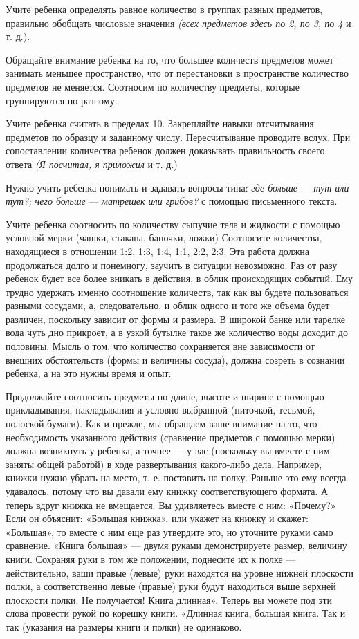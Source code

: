 \documentclass[a5paper]{book}
\renewcommand{\emph}[1]{\textit{#1}}
\begin{document}
Учите ребенка определять равное количество в группах разных предметов,
правильно обобщать числовые значения \emph{(всех предметов здесь по 2,
по 3, по 4} и т. д.).

Обращайте внимание ребенка на то, что большее количеств предметов может
занимать меньшее пространство, что от перестановки в пространстве
количество предметов не меняется. Соотносим по количеству предметы,
которые группируются по-разному.

Учите ребенка считать в пределах 10. Закрепляйте навыки отсчитывания
предметов по образцу и заданному числу. Пересчитывание проводите вслух.
При сопоставлении количества ребенок должен доказывать правильность
своего ответа \emph{(Я посчитал, я приложил} и т. д.)

Нужно учить ребенка понимать и задавать вопросы типа: \emph{где больше}
--- \emph{тут или тут?; чего больше} --- \emph{матрешек или грибов?} с
помощью письменного текста.

Учите ребенка соотносить по количеству сыпучие тела и жидкости с помощью
условной мерки (чашки, стакана, баночки, ложки) Соотносите количества,
находящиеся в отношении 1:2, 1:3, 1:4, 1:1, 2:2, 2:3. Эта работа должна
продолжаться долго и понемногу, заучить в ситуации невозможно. Раз от
разу ребенок будет все более вникать в действия, в облик происходящих
событий. Ему трудно удержать именно соотношение количеств, так как вы
будете пользоваться разными сосудами, а, следовательно, и облик одного и
того же объема будет различен, поскольку зависит от формы и размера. В
широкой банке или тарелке вода чуть дно прикроет, а в узкой бутылке
такое же количество воды доходит до половины. Мысль о том, что
количество сохраняется вне зависимости от внешних обстоятельств (формы и
величины сосуда), должна созреть в сознании ребенка, а на это нужны
время и опыт.

Продолжайте соотносить предметы по длине, высоте и ширине с помощью
прикладывания, накладывания и условно выбранной (ниточкой, тесьмой,
полоской бумаги). Как и прежде, мы обращаем ваше внимание на то, что
необходимость указанного действия (сравнение предметов с помощью мерки)
должна возникнуть у ребенка, а точнее --- у вас (поскольку вы вместе с
ним заняты общей работой) в ходе развертывания какого-либо дела.
Например, книжки нужно убрать на место, т. е. поставить на полку. Раньше
это ему всегда удавалось, потому что вы давали ему книжку
соответствующего формата. А теперь вдруг книжка не вмещается. Вы
удивляетесь вместе с ним: «Почему?» Если он объяснит: «Большая книжка»,
или укажет на книжку и скажет: «Большая», то вместе с ним еще раз
утвердите это, но уточните руками само сравнение. «Книга большая» ---
двумя руками демонстрируете размер, величину книги. Сохраняя руки в том
же положении, поднесите их к полке --- действительно, ваши правые
(левые) руки находятся на уровне нижней плоскости полки, а
соответственно левые (правые) руки будут находиться выше верхней
плоскости полки. Не получается! Книга длинная». Теперь вы можете под эти
слова провести рукой по корешку книги. «Длинная книга, большая книга.
Так и так (указания на размеры книги и полки) не одинаково.
\end{document}
